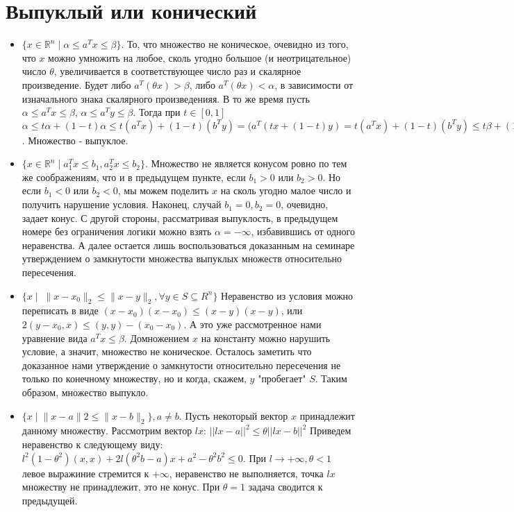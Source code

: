 \documentclass{article}
\begin{document}
\section{Выпуклый или конический}
\begin{itemize}  
\item $ \{ x \in \mathbb{R}^n \;|\; \alpha \leq a^Tx \leq \beta \} $. То, что множество не коническое, очевидно из того, что $x$ можно умножить на любое, сколь угодно большое (и неотрицательное) число $\theta$, увеличивается в соответствующее число раз и скалярное произведение. Будет либо $a^T(\theta x) > \beta $, либо $a^T(\theta x) < \alpha$, в зависимости от изначального знака скалярного произведенияя. В то же время пусть $ \alpha \leq a^Tx \leq \beta$, $ \alpha \leq a^Ty \leq \beta$. Тогда при $t \in [0, 1]$
$\alpha \leq t\alpha + (1 - t)\alpha \leq t(a^Tx) + (1 - t)(b^Ty) = (a^T(tx + (1-t)y) = t(a^Tx) + (1 - t)(b^Ty) \leq t\beta + (1 - t)\beta \leq \beta$. Множество - выпуклое.
\item $\{x \in \mathbb{R}^n \;| \; a_1^Tx \leq b_1, a^T_2x \leq b_2\}$. Множество не является конусом ровно по тем же соображениям, что и в предыдущем пункте, если $b_1 > 0$ или $b_2 > 0$. Но если $b_1 < 0$ или $b_2 < 0$, мы можем поделить $x$ на сколь угодно малое число и получить нарушение условия. Наконец, случай $b_1 = 0, b_2 = 0$, очевидно, задает конус. С другой стороны, рассматривая выпуклость, в предыдущем номере без ограничения логики можно взять $\alpha = -\infty$, избавившись от одного неравенства. А далее остается лишь воспользоваться доказанным на семинаре утверждением о замкнутости множества выпуклых множеств относительно пересечения.
\item $\{x \; |\; \; \|x - x_0\|_2 \leq \|x - y\|_2, \forall y \in S \subseteq R^n\}$
Неравенство из условия можно переписать в виде 
$(x - x_0)(x - x_0) \leq (x - y)(x - y)$, или
$ 2(y - x_0, x) \leq (y, y) - (x_0 - x_0)$.
А это уже рассмотренное нами уравнение вида $a^Tx \leq \beta$. Домножением $x$ на константу можно нарушить условие, а значит, множество не коническое. Осталось заметить что доказанное нами утверждение о замкнутости относительно пересечения не только по конечному множеству, но и когда, скажем, $y$ "пробегает" $S$. Таким образом, множество выпукло.
\item  $\{x \;| \; \|x - a\|2 \leq \|x - b\|_2\}, a \neq b$. Пусть некоторый вектор $x$ принадлежит данному множеству. Рассмотрим вектор $lx$:  $||lx - a||^2 \leq \theta||lx - b||^2$ Приведем неравенство к следующему виду: $l^2(1 - \theta^2)(x, x) + 2l(\theta^2 b - a)x + a^2 - \theta^2 b^2 \leq 0$. При $l \rightarrow +\infty, \theta < 1$ левое выражиние стремится к $+\infty$, неравенство не выполняется, точка $lx$ множеству не принадлежит, это не конус. При $\theta = 1$ задача сводится к предыдущей.


\end{itemize}
\end{document}
